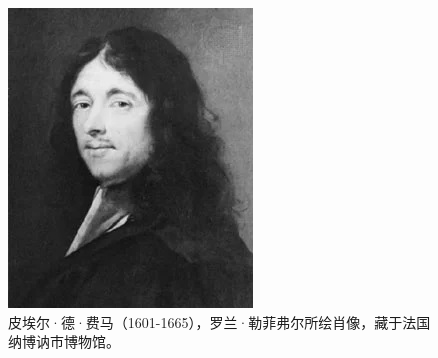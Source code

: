 \documentclass[b5paper]{ctexart}
\begin{document}
\begin{figure}[htbp]
  \centering
  \includegraphics[scale=1.5]{img/Fermat}
  \caption{皮埃尔·德·费马（1601-1665），罗兰·勒菲弗尔所绘肖像，藏于法国纳博讷市博物馆。}
 \label{fig:Fermat}
\end{figure}
\end{document}

